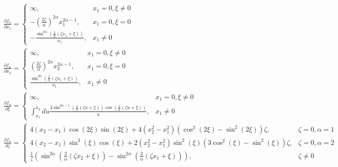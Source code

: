 \documentclass[12pt]{article}
\begin{document}
\begin{subequations}
\begin{align}
&\frac{\partial f_{\alpha}}{\partial x_1} =
	\begin{cases}
	\infty,													& x_1=0, \xi\neq0\\
	-\left(\frac{2\zeta}{\alpha}\right)^{2\alpha}x_1^{2\alpha-1},			& x_1=0, \xi=0\\
	-\frac{\sin^{2\alpha}\left(\frac{2}{\alpha}(\zeta x_1+\xi)\right)}{x_1},	& x_1\neq0
	\end{cases}\label{eq:dfdx_1}\\
&\frac{\partial f_{\alpha}}{\partial x_2} =
	\begin{cases}
	\infty,													& x_1=0, \xi\neq0\\
	\left(\frac{2\zeta}{\alpha}\right)^{2\alpha}x_2^{2\alpha-1},			& x_1=0, \xi=0\\
	\frac{\sin^{2\alpha}\left(\frac{2}{\alpha}(\zeta x_1+\xi)\right)}{x_1},	& x_1\neq0
	\end{cases}\label{eq:dfdx_2}\\
&\frac{\partial f_{\alpha}}{\partial \xi} = 
	\begin{cases}
	\infty,													& x_1 = 0,\xi\neq0\\
	\int_{x_1}^{x_2}du\frac{4\sin^{2\alpha-1}\left(\frac{2}{\alpha}(\zeta u+\xi)\right)\cos\left(\frac{2}{\alpha}(\zeta u+\xi)\right)}{u},	& x_1\neq0
	\end{cases}\label{eq:dfdxi}\\
&\frac{\partial f_{\alpha}}{\partial\zeta} = 
	\begin{cases}
	4(x_2-x_1)\cos(2\xi)\sin(2\xi)+4(x_2^2-x_1^2)(\cos^2(2\xi)-\sin^2(2\xi))\zeta,	&\zeta=0,\alpha=1\\
	4(x_2-x_1)\sin^3(\xi)\cos(\xi)+2(x_2^2-x_1^2)\sin^2(\xi)(3\cos^2(\xi)-\sin^2(\xi))\zeta,	&\zeta=0,\alpha=2\\
	\frac{1}{\zeta}\left(\sin^{2\alpha}\left(\frac{2}{\alpha}(\zeta x_2+\xi)\right)-\sin^{2\alpha}\left(\frac{2}{\alpha}(\zeta x_1+\xi)\right)\right),		&\zeta\neq0
	\end{cases}\label{eq:dfdzeta}
\end{align}
\end{subequations}
\end{document}
